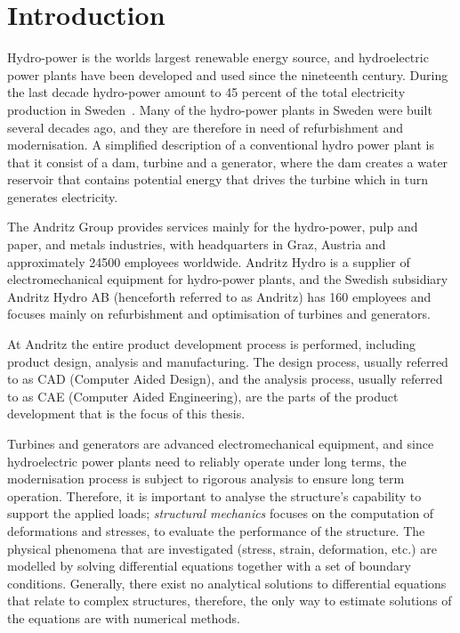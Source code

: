 
\chapter{Introduction}
\label{cha:introdution}
Hydro-power is the worlds largest renewable energy source, and hydroelectric power plants have been developed and used since the nineteenth century. During the last decade hydro-power amount to 45 percent of the total electricity production in Sweden~\cite{scb}. Many of the hydro-power plants in Sweden were built several decades ago, and they are therefore in need of refurbishment and modernisation. A simplified description of a conventional hydro power plant is that it consist of a dam, turbine and a generator, where the dam creates a water reservoir that contains potential energy that drives the turbine which in turn generates electricity.

The Andritz Group provides services mainly for the hydro-power, pulp and paper, and metals industries, with headquarters in Graz, Austria and approximately \num{24500} employees worldwide. Andritz Hydro is a supplier of electromechanical equipment for hydro-power plants, and the Swedish subsidiary Andritz Hydro AB (henceforth referred to as Andritz) has 160 employees and focuses mainly on refurbishment and optimisation of turbines and generators.

At Andritz the entire product development process is performed, including product design, analysis and manufacturing. The design process, usually referred to as CAD (Computer Aided Design), and the analysis process, usually referred to as CAE (Computer Aided Engineering), are the parts of the product development that is the focus of this thesis.

Turbines and generators are advanced electromechanical equipment, and since hydroelectric power plants need to reliably operate under long terms, the modernisation process is subject to rigorous analysis to ensure long term operation. Therefore, it is important to analyse the structure's capability to support the applied loads; \textit{structural mechanics} focuses on the computation of deformations and stresses, to evaluate the performance of the structure. The physical phenomena that are investigated (stress, strain, deformation, etc.) are modelled by solving differential equations together with a set of boundary conditions. Generally, there exist no analytical solutions to differential equations that relate to complex structures, therefore, the only way to estimate solutions of the equations are with numerical methods.

